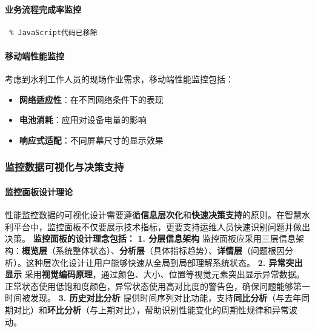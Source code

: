 \paragraph{业务流程完成率监控}\label{ux4e1aux52a1ux6d41ux7a0bux5b8cux6210ux7387ux76d1ux63a7} \begin{lstlisting} % JavaScript代码已移除
\end{lstlisting} \paragraph{移动端性能监控}\label{ux79fbux52a8ux7aefux6027ux80fdux76d1ux63a7} 考虑到水利工作人员的现场作业需求，移动端性能监控包括：
\begin{itemize} \tightlist \item \textbf{网络适应性}：在不同网络条件下的表现 \item \textbf{电池消耗}：应用对设备电量的影响 \item
\textbf{响应式适配}：不同屏幕尺寸的显示效果 \end{itemize}
\subsubsection{监控数据可视化与决策支持}\label{ux76d1ux63a7ux6570ux636eux53efux89c6ux5316ux4e0eux51b3ux7b56ux652fux6301}
\paragraph{监控面板设计理论}\label{ux76d1ux63a7ux9762ux677fux8bbeux8ba1ux7406ux8bba}
性能监控数据的可视化设计需要遵循\textbf{信息层次化}和\textbf{快速决策支持}的原则。在智慧水利平台中，监控面板不仅要展示技术指标，更要支持运维人员快速识别问题并做出决策。 \textbf{监控面板的设计理念包括：}
\textbf{1. 分层信息架构}
监控面板应采用三层信息架构：\textbf{概览层}（系统整体状态）、\textbf{分析层}（具体指标趋势）、\textbf{详情层}（问题根因分析）。这种层次化设计让用户能够快速从全局到局部理解系统状态。 \textbf{2.
异常突出显示} 采用\textbf{视觉编码原理}，通过颜色、大小、位置等视觉元素突出显示异常数据。正常状态使用低饱和度颜色，异常状态使用高对比度的警告色，确保问题能够第一时间被发现。 \textbf{3. 历史对比分析}
提供时间序列对比功能，支持\textbf{同比分析}（与去年同期对比）和\textbf{环比分析}（与上期对比），帮助识别性能变化的周期性规律和异常波动。
